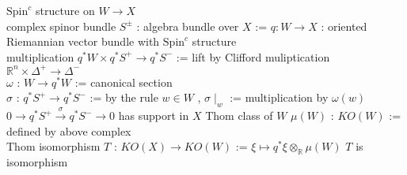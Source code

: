 \begin{Theorem}
\itemdefi
  \For \(\text{Spin}^c\) structure on \(W \to X\) \\
  \Define complex spinor bundle \(S^{\pm}\) : algebra bundle over \(X\) := \WIP
\itemdefi
  \For \(q : W \to X\) : oriented Riemannian vector bundle with \(\text{Spin}^c\) structure \\
  \Define multiplication \(q^* W \times q^* {S^+} \to q^*{S^-}\) := lift by Clifford muliptication \(\mathbb{R}^n \times \Delta^+ \to \Delta^-\) \\
  \Define \(\omega\) : \(W \to q^* W\) := canonical section \\
  \Define \(\sigma\) : \(q^* {S^+} \to q^* {S^-}\) := by the rule \(w \in W\) , \(\sigma\mid_w\) := multiplication by \(\omega(w)\)
\itemprop
  \Then \(0 \to q^* {S^+} \overset{\sigma}{\to} q^* {S^-} \to 0\) has support in \(X\)
\itemdefi
  \Define Thom class of \(W\) \(\mu(W)\) : \(KO(W)\) := defined by above complex \\
  \Define Thom isomorphism \(T\) : \(KO(X) \to KO(W)\) := \(\xi \mapsto q^*\xi \otimes_{\mathbb{R}} \mu(W)\)
\itemprop
  \(T\) is isomorphism
\end{Theorem}